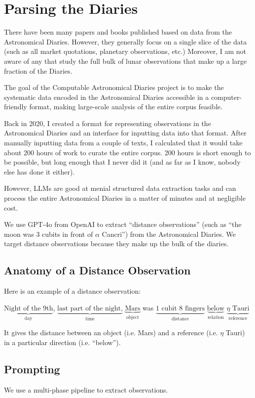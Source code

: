 \documentclass{article}
\newcommand\annotation[2]{\(\underbrace{\text{#1}}_\text{#2}\)}
\begin{document}
\section{Parsing the Diaries}
There have been many papers and books published based on data from the Astronomical Diaries. However, they generally focus on a single slice of the data (such as all market quotations, planetary observations, etc.) Moreover, I am not aware of any that study the full bulk of lunar observations that make up a large fraction of the Diaries.

The goal of the Computable Astronomical Diaries project is to make the systematic data encoded in the Astronomical Diaries accessible in a computer-friendly format, making large-scale analysis of the entire corpus feasible.

Back in 2020, I created a format for representing observations in the Astronomical Diaries and an interface for inputting data into that format. After manually inputting data from a couple of texts, I calculated that it would take about 200 hours of work to curate the entire corpus. 200 hours is short enough to be possible, but long enough that I never did it (and as far as I know, nobody else has done it either).

However, LLMs are good at menial structured data extraction tasks and can process the entire Astronomical Diaries in a matter of minutes and at negligible cost.

We use GPT-4o from OpenAI to extract ``distance observations'' (such as ``the moon was 3 cubits in front of $\alpha$ Cancri'') from the Astronomical Diaries. We target distance observations because they make up the bulk of the diaries.

\subsection{Anatomy of a Distance Observation}
Here is an example of a distance observation:
\begin{displayquote}
\annotation{Night of the 9th}{day}, \annotation{last part of the night,}{time} \annotation{Mars}{object} was \annotation{1 cubit 8 fingers}{distance} \annotation{below}{relation} \annotation{$\eta$ Tauri}{reference}
\end{displayquote}
It gives the distance between an object (i.e. Mars) and a reference (i.e. $\eta$ Tauri) in a particular direction (i.e. ``below'').

\subsection{Prompting}
We use a multi-phase pipeline to extract observations.
\end{document}
